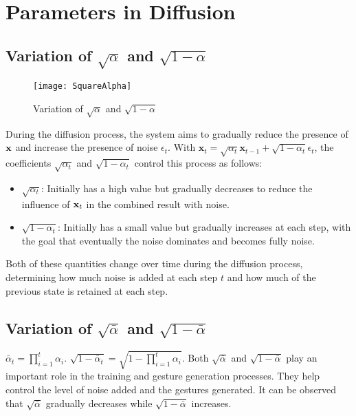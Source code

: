\appendix
\renewcommand{\chaptername}{Appendix}
\chapter{Parameters in Diffusion}
\label{appendix:Appendix1}

\section{Variation of $\sqrt{\alpha}$ and $\sqrt{1 - \alpha}$}

\begin{figure}[h]
	\texttt{[image: SquareAlpha]}
	\label{fig:wrapfig}
	\caption{Variation of $\sqrt{\alpha}$ and $\sqrt{1 - \alpha}$}
\end{figure}

During the diffusion process, the system aims to gradually reduce the presence of $\mathbf{x}$ and increase the presence of noise $\epsilon_t$. With $\mathbf{x}_{t} = \sqrt{\alpha_t} \mathbf{x}_{t-1} + \sqrt{1 - \alpha_t} \epsilon_t$, the coefficients $\sqrt{\alpha_t}$ and $\sqrt{1 - \alpha_t}$ control this process as follows:

\begin{itemize}
	\item $\sqrt{\alpha_t}$: Initially has a high value but gradually decreases to reduce the influence of $\mathbf{x}_t$ in the combined result with noise.
	\item $\sqrt{1 - \alpha_t}$: Initially has a small value but gradually increases at each step, with the goal that eventually the noise dominates and becomes fully noise.
\end{itemize}

Both of these quantities change over time during the diffusion process, determining how much noise is added at each step $t$ and how much of the previous state is retained at each step.

\section{Variation of $\sqrt{\bar{\alpha}}$ and $\sqrt{1 - \bar{\alpha}}$}

$\bar{\alpha}_t = \prod_{i=1}^t \alpha_i$.  $\sqrt{1 - \bar{\alpha}_t} = \sqrt{1 - \prod_{i=1}^t \alpha_i}$. Both $\sqrt{\bar{\alpha}}$ and $\sqrt{1 - \bar{\alpha}}$ play an important role in the training and gesture generation processes. They help control the level of noise added and the gestures generated. It can be observed that $\sqrt{\bar{\alpha}}$ gradually decreases while $\sqrt{1 - \bar{\alpha}}$ increases.

